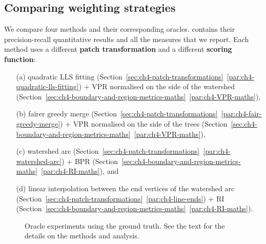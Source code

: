 \subsection{Comparing weighting strategies}
We compare four methods and their corresponding oracles.  contains their precision-recall quantitative results and  all the measures that we report. Each method uses a different {\bf patch transformation} and a different {\bf scoring function}: %
\begin{enumerate}
 \item[(a)] quadratic LLS fitting (Section~\ref*{sec:ch4-patch-transformations}~\ref{par:ch4-quadratic-lls-fitting}) + VPR normalised on the side of the watershed (Section~\ref*{sec:ch4-boundary-and-region-metrics-maths}~\ref{par:ch4-VPR-maths}),
 \item[(b)] fairer greedy merge (Section~\ref*{sec:ch4-patch-transformations}~\ref{par:ch4-fair-greedy-merge}) + VPR normalised on the side of the trees (Section~\ref*{sec:ch4-boundary-and-region-metrics-maths}~\ref{par:ch4-VPR-maths}),
 \item[(c)] watershed arc (Section~\ref*{sec:ch4-patch-transformations}~\ref{par:ch4-watershed-arc}) + BPR (Section~\ref*{sec:ch4-boundary-and-region-metrics-maths}~\ref{par:ch4-RI-maths}), and 
 \item[(d)] %
 linear interpolation between %
 the end vertices of the watershed arc (Section~\ref*{sec:ch4-patch-transformations}~\ref{par:ch4-line-ends}) + RI
(Section~\ref*{sec:ch4-boundary-and-region-metrics-maths}~\ref{par:ch4-RI-maths}).
\end{enumerate}

\begin{figure}[t]
\centering
\caption[Oracle experiments using the ground truth - plots]{Oracle experiments using the ground truth. See the text for the details on the methods and analysis.}
\label{fig:oracle}
\end{figure}


